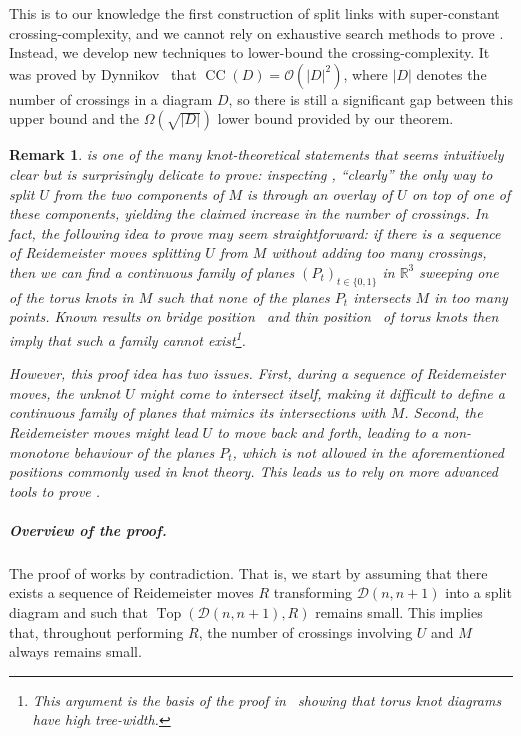 \documentclass{article}
\newcommand{\addcross}{\operatorname{Top}}
\newcommand{\unlink}{\operatorname{CC}}
\newtheorem{remark}[theorem]{Remark}
\begin{document}
This is to our knowledge the first construction of split links with super-constant crossing-complexity, and we cannot rely on exhaustive search methods to prove . Instead, we develop new techniques to lower-bound the crossing-complexity. It was proved by Dynnikov~\cite[Theorem~2]{Dynnikov_arc} that $\unlink(D)= \mathcal{O}(|D|^2)$, where $|D|$ denotes the number of crossings in a diagram $D$, so there is still a significant gap between this upper bound and the $\Omega(\sqrt{|D|})$ lower bound provided by our theorem.

\begin{remark}
\label{rem:caution}
 is one of the many knot-theoretical statements that seems intuitively clear but is surprisingly delicate to prove: inspecting , ``clearly'' the only way to split $U$ from the two components of $M$ is through an overlay of $U$ on top of one of these components, yielding the claimed increase in the number of crossings. In fact, the following idea to prove  may seem straightforward: 
if there is a sequence of Reidemeister moves splitting $U$ from $M$ without adding too many crossings, then we can find a continuous family of planes $(P_t)_{t\in \{0,1\}}$ in $\mathbb{R}^3$ sweeping one of the torus knots in $M$ such that none of the planes $P_t$ intersects $M$ in too many points. Known results on \emph{bridge position}~\cite{schubert1954numerische,schultens2007bridge} and \emph{thin position}~\cite{gabai1987foliations,scharlemann2005thin} of torus knots then imply that such a family cannot exist\footnote{This argument is the basis of the proof in~\cite{Mesmay_treewidth} showing that torus knot diagrams have high tree-width.}. 

However, this proof idea has two issues. First, during a sequence of Reidemeister moves, the unknot $U$ might come to intersect itself, making it difficult to define a continuous family of planes that mimics its intersections with $M$.  Second, the Reidemeister moves might lead $U$ to move back and forth, leading to a non-monotone behaviour of the planes $P_t$, which is not allowed in the aforementioned positions commonly used in knot theory. This leads us to rely on more advanced tools to prove . 
\end{remark}

\subparagraph*{Overview of the proof.} The proof of  works by contradiction. That is, we start by assuming that there exists a sequence of Reidemeister moves $R$ transforming $\mathcal{D}(n,n+1)$ into a split diagram and such that $\addcross(\mathcal{D}(n,n+1),R)$ remains small. This implies that, throughout performing $R$, the number of crossings involving $U$ and $M$ always remains small. 
\end{document}
